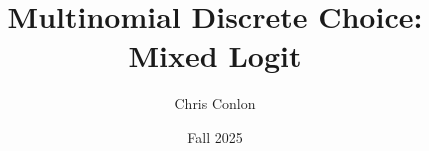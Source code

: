 


\title{Multinomial Discrete Choice: Mixed Logit}
\author{Chris Conlon}
\date{Fall 2025}

\frame{\titlepage}

%

